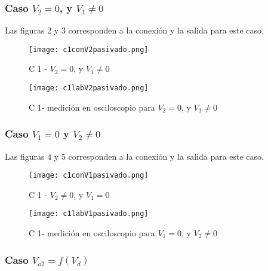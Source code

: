 \vspace{1em}

\subsubsection{Caso $V_2=0$, y $V_1 \neq 0$} 
Las figuras 2 y 3 corresponden a la conexión y la salida para este caso.

\vspace{1em}

  \begin{figure}[h!]
     \centering
     \texttt{[image: c1conV2pasivado.png]}
     \caption{C 1 - $V_2=0$, y $V_1 \neq 0$}
     \label{fig:enter-label}
 \end{figure}

\vspace{1em}

  \begin{figure}[h!]
     \centering
     \texttt{[image: c1labV2pasivado.png]}
     \caption{C 1- medición en osciloscopio para $V_2=0$, y $V_1 \neq 0$}
     \label{fig:enter-label}
 \end{figure}

\vspace{1em}

\subsubsection{Caso $V_1 = 0$ y $V_2 \neq 0$} 
Las figuras 4 y 5 corresponden a la conexión y la salida para este caso.

\vspace{1em}

 \begin{figure}[h!]
     \centering
     \texttt{[image: c1conV1pasivado.png]}
     \caption{C 1 -  $V_2 \neq 0$, y $V_1 = 0$}
     \label{fig:enter-label}
 \end{figure}

\vspace{1em}

  \begin{figure}[h!]
     \centering
     \texttt{[image: c1labV1pasivado.png]}
     \caption{C 1- medición en osciloscopio para $V_1=0$, y $V_2 \neq 0$}
     \label{fig:enter-label}
 \end{figure}

\vspace{1em}

\subsubsection{Caso $V_{o2} = f(V_d)$} 

